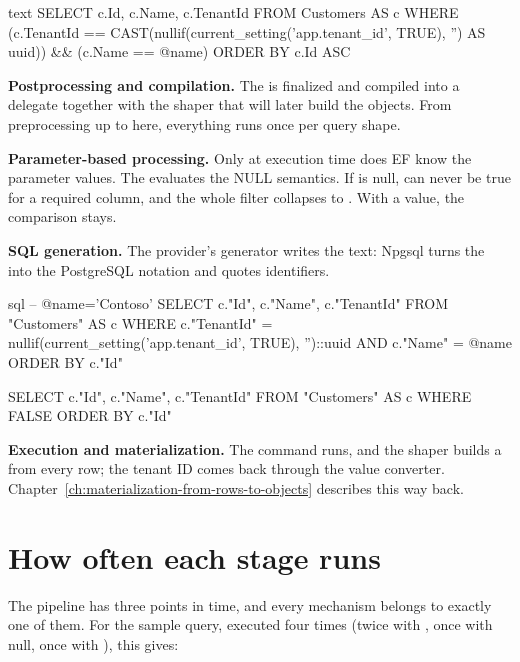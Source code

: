 \begin{sourcecode}{text}
SELECT c.Id, c.Name, c.TenantId
FROM Customers AS c
WHERE (c.TenantId == CAST(nullif(current_setting('app.tenant_id', TRUE), '') AS uuid))
    && (c.Name == @name)
ORDER BY c.Id ASC
\end{sourcecode}

\textbf{Postprocessing and compilation.} The  is
finalized and compiled into a delegate together with the shaper that will later build the
objects. From preprocessing up to here, everything runs once per query shape.

\textbf{Parameter-based processing.} Only at execution time does EF know the parameter
values. The
evaluates the NULL semantics. If  is null,  can
never be true for a required column, and the whole filter collapses to . With a
value, the comparison stays.

\textbf{SQL generation.} The provider's generator writes the text: Npgsql turns the
 into the PostgreSQL notation  and quotes identifiers.

\begin{sourcecode}[To\allowbreak{}Query\allowbreak{}String(\allowbreak{}) with name = "Contoso" and with name = null]{sql}
-- @name='Contoso'
SELECT c."Id", c."Name", c."TenantId"
FROM "Customers" AS c
WHERE c."TenantId" = nullif(current_setting('app.tenant_id', TRUE), '')::uuid
    AND c."Name" = @name
ORDER BY c."Id"

SELECT c."Id", c."Name", c."TenantId"
FROM "Customers" AS c
WHERE FALSE
ORDER BY c."Id"
\end{sourcecode}

\textbf{Execution and materialization.} The command runs, and the shaper builds a
 from every row; the tenant ID comes back through the value converter.
Chapter~\ref{ch:materialization-from-rows-to-objects} describes this way back.

\section{How often each stage runs}

The pipeline has three points in time, and every mechanism belongs to exactly one of them.
For the sample query, executed four times (twice with , once with null,
once with ), this gives:

